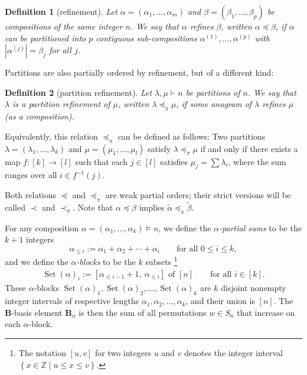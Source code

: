 \documentclass[submission]{FPSAC2026}
\newtheorem{defn}{Definition}
\newcommand{\ZZ}{\mathbb{Z}} %
\newcommand{\BB}{\mathbf{B}} %
\newcommand{\Set}{\operatorname{Set}}
\newcommand{\set}[1]{\left\{ #1 \right\}}
\newcommand{\tup}[1]{\left( #1 \right)}
\newcommand{\ive}[1]{\left[ #1 \right]}
\begin{document}
\begin{defn}[refinement]
Let \(\alpha=(\alpha_1,\dots,\alpha_m)\) and
\(\beta=(\beta_1,\dots,\beta_p)\) be compositions of the same integer
\(n\). We say that \(\alpha\) \emph{refines} \(\beta\), written
\(\alpha\preceq\beta\), if \(\alpha\) can be partitioned into \(p\)
contiguous sub-compositions \(\alpha^{(1)},\dots,\alpha^{(p)}\) with
\(|\alpha^{(j)}|=\beta_j\) for all \(j\).
\end{defn}

Partitions are also partially ordered by refinement, but of a different kind:

\begin{defn}[partition refinement]
Let \(\lambda,\mu\vdash n\) be partitions of \(n\).  We say that \(\lambda\) is a
\emph{partition refinement} of \(\mu\), written \(\lambda\preceq_\pi\mu\),
if some anagram of \(\lambda\) refines \(\mu\)
(as a composition).
\end{defn}

Equivalently, this relation $\preceq_\pi$ can be defined as follows:
Two partitions $\lambda = \tup{\lambda_1, \dots, \lambda_k}$
and $\mu = \tup{\mu_1, \dots, \mu_l}$ satisfy $\lambda \preceq_\pi \mu$
if and only if there exists a map $f : [k] \to [l]$ such that
each $j \in [l]$ satisfies $\mu_j = \sum \lambda_i$, where the sum
ranges over all $i \in f^{-1}(j)$.

Both relations $\preceq$ and $\preceq_\pi$ are weak partial orders;
their strict versions will be called $\prec$ and $\prec_\pi$.
Note that $\alpha \preceq \beta$ implies
$\widetilde{\alpha} \preceq_\pi \widetilde{\beta}$.

For any composition $\alpha = \tup{\alpha_1, \ldots, \alpha_k} \vDash n$,
we define the \emph{\(\alpha\)-partial sums} to be the $k+1$ integers
\[
\alpha_{\le i} := \alpha_1 + \alpha_2 + \cdots + \alpha_i
\qquad \text{for all } 0 \leq i \leq k,
\]
and we define the \emph{\(\alpha\)-blocks} to be the $k$ subsets%
\footnote{The notation $\ive{u, v}$ for two integers $u$ and $v$
denotes the integer interval $\set{x \in \ZZ \mid u \leq x \leq v}$.}
\begin{align}
\Set(\alpha)_i := \ive{ \alpha_{\le i-1} + 1, \ \alpha_{\le i} }
\text{ of } \ive{n}
\qquad \text{for all } i \in [k].
\label{eq.alpha-blocks}
\end{align}
These \(\alpha\)-blocks
\(\Set(\alpha)_1, \Set(\alpha)_2, \ldots, \Set(\alpha)_k\)
are $k$ disjoint nonempty integer intervals
of respective lengths \(\alpha_1, \alpha_2, \ldots, \alpha_k\),
and their union is $[n]$.
The $\BB$-basis element $\BB_\alpha$ is then the sum of all
permutations $w \in S_n$ that increase on each $\alpha$-block.
\end{document}
